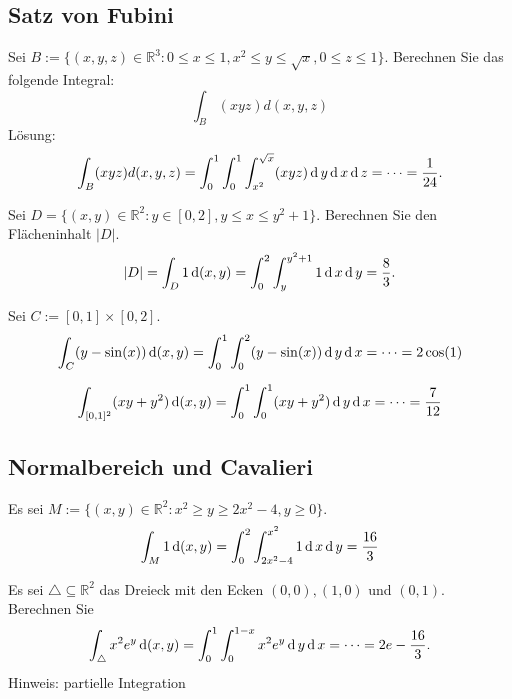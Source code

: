 \subsection{Satz von Fubini}
Sei $B := \{(x,y,z) \in \mathbb{R}^3 : 0 \leq x \leq 1, x^2 \leq y \leq \sqrt{x}, 0 \leq z \leq 1\}$.
Berechnen Sie das folgende Integral:
\begin{displaymath}
  \int_B (xyz) d(x,y,z)
\end{displaymath}
Lösung:
\begin{displaymath}
  \int_B (xyz) d(x,y,z) = \int_0^1 \int_0^1 \int_{x^2}^{\sqrt{x}} (xyz) \operatorname{\mathop{}\!\mathrm{d}} y \operatorname{\mathop{}\!\mathrm{d}} x \operatorname{\mathop{}\!\mathrm{d}} z = \dots = \frac{1}{24}.
\end{displaymath}

Sei $D = \{(x,y) \in \mathbb{R}^2 : y \in [0,2], y \leq x \leq y^2 + 1\}$.
Berechnen Sie den Flächeninhalt $|D|$.
\begin{displaymath}
  |D| = \int_D 1 \operatorname{\mathop{}\!\mathrm{d}} (x,y) = \int_0^2 \int_y^{y^2 + 1} 1 \operatorname{\mathop{}\!\mathrm{d}} x \operatorname{\mathop{}\!\mathrm{d}} y = \frac{8}{3}.
\end{displaymath}

Sei $C := [0,1] \times [0,2]$.
\begin{displaymath}
  \int_C (y - \sin(x)) \operatorname{\mathop{}\!\mathrm{d}}(x,y) = \int_0^1 \int_0^2 (y - \sin(x)) \operatorname{\mathop{}\!\mathrm{d}} y \operatorname{\mathop{}\!\mathrm{d}} x = \dots = 2 \cos(1)
\end{displaymath}

\begin{displaymath}
  \int_{[0,1]^2} (xy + y^2) \operatorname{\mathop{}\!\mathrm{d}}(x,y) = \int_0^1 \int_0^1 (xy + y^2) \operatorname{\mathop{}\!\mathrm{d}} y \operatorname{\mathop{}\!\mathrm{d}} x = \dots = \frac{7}{12}
\end{displaymath}

\subsection{Normalbereich und Cavalieri}
Es sei $M := \{(x,y) \in \mathbb{R}^2 : x^2 \geq y \geq 2x^2 - 4, y \geq 0\}$.
\begin{displaymath}
  \int_M 1 \operatorname{\mathop{}\!\mathrm{d}} (x,y) = \int_0^2 \int_{2x^2 - 4}^{x^2} 1 \operatorname{\mathop{}\!\mathrm{d}} x \operatorname{\mathop{}\!\mathrm{d}} y = \frac{16}{3}
\end{displaymath}

Es sei $\triangle \subseteq \mathbb{R}^2$ das Dreieck mit den Ecken $(0,0), (1,0)$ und $(0,1)$.
Berechnen Sie
\begin{displaymath}
  \int_{\triangle} x^2e^y \operatorname{\mathop{}\!\mathrm{d}} (x,y) = \int_0^1 \int_0^{1 - x} x^2 e^y \operatorname{\mathop{}\!\mathrm{d}} y \operatorname{\mathop{}\!\mathrm{d}} x = \dots = 2e - \frac{16}{3}.
\end{displaymath}
Hinweis: partielle Integration

